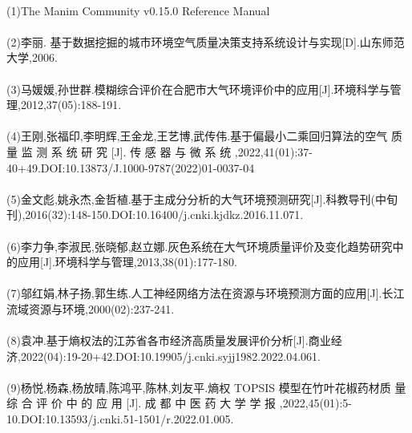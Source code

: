 \documentclass[preview]{standalone}
\begin{document}
\begin{center}
\quad\\(1)The Manim Community v0.15.0 Reference Manual\quad\\\quad\\(2)李丽. 基于数据挖掘的城市环境空气质量决策支持系统设计与实现[D].山东师范大学,2006.\quad\\\quad\\(3)马媛媛,孙世群.模糊综合评价在合肥市大气环境评价中的应用[J].环境科学与管理,2012,37(05):188-191.\quad\\\quad\\(4)王刚,张福印,李明辉,王金龙,王艺博,武传伟.基于偏最小二乘回归算法的空气 质 量 监 测 系 统 研 究 [J]. 传 感 器 与 微 系 统 ,2022,41(01):37-40+49.DOI:10.13873/J.1000-9787(2022)01-0037-04\quad\\\quad\\(5)金文彪,姚永杰,金哲植.基于主成分分析的大气环境预测研究[J].科教导刊(中旬刊),2016(32):148-150.DOI:10.16400/j.cnki.kjdkz.2016.11.071.\quad\\\quad\\(6)李力争,李淑民,张晓郁,赵立娜.灰色系统在大气环境质量评价及变化趋势研究中的应用[J].环境科学与管理,2013,38(01):177-180.\quad\\\quad\\(7)邬红娟,林子扬,郭生练.人工神经网络方法在资源与环境预测方面的应用[J].长江流域资源与环境,2000(02):237-241.\quad\\\quad\\(8)袁冲.基于熵权法的江苏省各市经济高质量发展评价分析[J].商业经济,2022(04):19-20+42.DOI:10.19905/j.cnki.syjj1982.2022.04.061.\quad\\\quad\\(9)杨悦,杨森,杨放晴,陈鸿平,陈林,刘友平.熵权 TOPSIS 模型在竹叶花椒药材质 量 综 合 评 价 中 的 应 用 [J]. 成 都 中 医 药 大 学 学 报 ,2022,45(01):5-10.DOI:10.13593/j.cnki.51-1501/r.2022.01.005.\quad\\
\end{center}
\end{document}
